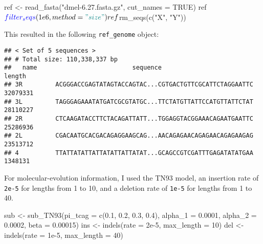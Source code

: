 \documentclass[12pt,]{article}
\newenvironment{Shaded}{}{}
\newcommand{\DataTypeTok}[1]{#1}
\newcommand{\DecValTok}[1]{#1}
\newcommand{\FloatTok}[1]{#1}
\newcommand{\KeywordTok}[1]{\textcolor[rgb]{0.00,0.00,1.00}{#1}}
\newcommand{\NormalTok}[1]{#1}
\newcommand{\OperatorTok}[1]{#1}
\newcommand{\OtherTok}[1]{\textcolor[rgb]{1.00,0.25,0.00}{#1}}
\newcommand{\StringTok}[1]{\textcolor[rgb]{0.00,0.50,0.50}{#1}}
\begin{document}
\begin{Shaded}
\begin{Highlighting}[]
\NormalTok{ref <-}\StringTok{ }\KeywordTok{read_fasta}\NormalTok{(}\StringTok{"dmel-6.27.fasta.gz"}\NormalTok{, }\DataTypeTok{cut_names =} \OtherTok{TRUE}\NormalTok{)}
\NormalTok{ref}\OperatorTok{$}\KeywordTok{filter_seqs}\NormalTok{(}\FloatTok{1e6}\NormalTok{, }\DataTypeTok{method =} \StringTok{"size"}\NormalTok{)}
\NormalTok{ref}\OperatorTok{$}\KeywordTok{rm_seqs}\NormalTok{(}\KeywordTok{c}\NormalTok{(}\StringTok{"X"}\NormalTok{, }\StringTok{"Y"}\NormalTok{))}
\end{Highlighting}
\end{Shaded}

This resulted in the following \texttt{ref\_genome} object:

\begin{verbatim}
## < Set of 5 sequences >
## # Total size: 110,338,337 bp
##   name                          sequence                             length
## 3R         ACGGGACCGAGTATAGTACCAGTAC...CGTGACTGTTCGCATTCTAGGAATTC  32079331
## 3L         TAGGGAGAAATATGATCGCGTATGC...TTCTATGTTATTCCATGTTATTCTAT  28110227
## 2R         CTCAAGATACCTTCTACAGATTATT...TGGAGGTACGGAAACAGAATGAATTC  25286936
## 2L         CGACAATGCACGACAGAGGAAGCAG...AACAGAGAACAGAGAACAGAGAAGAG  23513712
## 4          TTATTATATTATTATATTATTATAT...GCAGCCGTCGATTTGAGATATATGAA   1348131
\end{verbatim}

For molecular-evolution information, I used the TN93 model,
an insertion rate of \texttt{2e-5} for lengths from 1 to 10,
and
a deletion rate of \texttt{1e-5} for lengths from 1 to 40.

\begin{Shaded}
\begin{Highlighting}[]
\NormalTok{sub <-}\StringTok{ }\KeywordTok{sub_TN93}\NormalTok{(}\DataTypeTok{pi_tcag =} \KeywordTok{c}\NormalTok{(}\FloatTok{0.1}\NormalTok{, }\FloatTok{0.2}\NormalTok{, }\FloatTok{0.3}\NormalTok{, }\FloatTok{0.4}\NormalTok{),}
                \DataTypeTok{alpha_1 =} \FloatTok{0.0001}\NormalTok{, }\DataTypeTok{alpha_2 =} \FloatTok{0.0002}\NormalTok{,}
                \DataTypeTok{beta =} \FloatTok{0.00015}\NormalTok{)}
\NormalTok{ins <-}\StringTok{ }\KeywordTok{indels}\NormalTok{(}\DataTypeTok{rate =} \FloatTok{2e-5}\NormalTok{, }\DataTypeTok{max_length =} \DecValTok{10}\NormalTok{)}
\NormalTok{del <-}\StringTok{ }\KeywordTok{indels}\NormalTok{(}\DataTypeTok{rate =} \FloatTok{1e-5}\NormalTok{, }\DataTypeTok{max_length =} \DecValTok{40}\NormalTok{)}
\end{Highlighting}
\end{Shaded}
\end{document}
